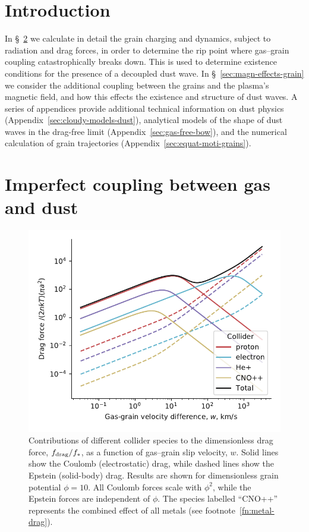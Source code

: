 
\section{Introduction}
\label{sec:rip-introduction}

In \S~\ref{sec:imperf-coupl-betw} we calculate in detail the grain
charging and dynamics, subject to radiation and drag forces, in order
to determine the rip point where gas--grain coupling catastrophically
breaks down.  This is used to determine existence conditions for the
presence of a decoupled dust wave.
%
In \S~\ref{sec:magn-effects-grain} we consider the additional coupling
between the grains and the plasma's magnetic field, and how this
effects the existence and structure of dust waves.
%
A series of appendices provide additional technical information on
dust physics (Appendix~\ref{sec:cloudy-models-dust}), analytical
models of the shape of dust waves in the drag-free limit
(Appendix~\ref{sec:gas-free-bow}), and the numerical calculation of
grain trajectories (Appendix~\ref{sec:equat-moti-grains}).

\section{Imperfect coupling between gas and dust}
\label{sec:imperf-coupl-betw}

\begin{figure}
  \includegraphics[width=\linewidth]{figs/test-Fdrag-components}
  \caption{Contributions of different collider species to the
    dimensionless drag force, \(f_{\text{drag}} / f_*\), as a function of
    gas--grain slip velocity, \(w\).  Solid lines show the Coulomb
    (electrostatic) drag, while dashed lines show the Epstein
    (solid-body) drag.  Results are shown for dimensionless grain
    potential \(\phi = 10\).  All Coulomb forces scale with
    \(\phi^2\), while the Epstein forces are independent of \(\phi\).  The
    species labelled ``CNO++'' represents the combined effect of all
    metals (see footnote~\ref{fn:metal-drag}).}
  \label{fig:drag-components}
\end{figure}


